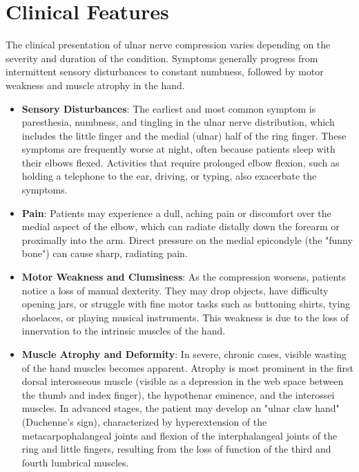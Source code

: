 \section*{Clinical Features}
The clinical presentation of ulnar nerve compression varies depending on the severity and duration of the condition. Symptoms generally progress from intermittent sensory disturbances to constant numbness, followed by motor weakness and muscle atrophy in the hand.

\begin{itemize}
  \item \textbf{Sensory Disturbances}: The earliest and most common symptom is paresthesia, numbness, and tingling in the ulnar nerve distribution, which includes the little finger and the medial (ulnar) half of the ring finger. These symptoms are frequently worse at night, often because patients sleep with their elbows flexed. Activities that require prolonged elbow flexion, such as holding a telephone to the ear, driving, or typing, also exacerbate the symptoms.
  \item \textbf{Pain}: Patients may experience a dull, aching pain or discomfort over the medial aspect of the elbow, which can radiate distally down the forearm or proximally into the arm. Direct pressure on the medial epicondyle (the "funny bone") can cause sharp, radiating pain.
  \item \textbf{Motor Weakness and Clumsiness}: As the compression worsens, patients notice a loss of manual dexterity. They may drop objects, have difficulty opening jars, or struggle with fine motor tasks such as buttoning shirts, tying shoelaces, or playing musical instruments. This weakness is due to the loss of innervation to the intrinsic muscles of the hand.
  \item \textbf{Muscle Atrophy and Deformity}: In severe, chronic cases, visible wasting of the hand muscles becomes apparent. Atrophy is most prominent in the first dorsal interosseous muscle (visible as a depression in the web space between the thumb and index finger), the hypothenar eminence, and the interossei muscles. In advanced stages, the patient may develop an "ulnar claw hand" (Duchenne's sign), characterized by hyperextension of the metacarpophalangeal joints and flexion of the interphalangeal joints of the ring and little fingers, resulting from the loss of function of the third and fourth lumbrical muscles.

\end{itemize}
